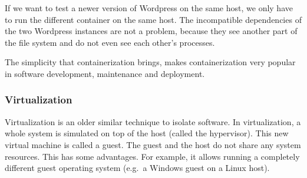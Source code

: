 If we want to test a newer version of Wordpress on the same host, we only have to run the different container on the same host. The incompatible dependencies of the two Wordpress instances are not a problem, because they see another part of the file system and do not even see each other's processes.

\hfill

The simplicity that containerization brings, makes containerization very popular in software development, maintenance and deployment.

\pagebreak

\subsubsection{Virtualization}
Virtualization is an older similar technique to isolate software. In virtualization, a whole system is simulated on top of the host (called the hypervisor). This new virtual machine is called a guest. The guest and the host do not share any system resources. This has some advantages. For example, it allows running a completely different guest operating system (e.g.\ a Windows guest on a Linux host).

